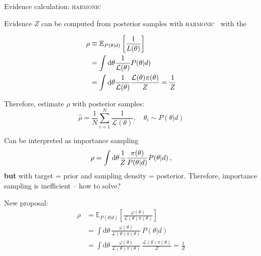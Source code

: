 \documentclass[usenames,dvipsnames,t]{beamer}
\begin{document}

\begin{frame}[allowframebreaks]{Evidence calculation: \textsc{harmonic}}

  Evidence $Z$ can be computed from posterior samples with \textsc{harmonic}~\cite{mcewen2023machinelearningassistedbayesian} with the 

  \begin{align*}
    \rho &\equiv \mathbb{E}_{P(\theta|d)}\left[\frac{1}{L(\theta)}\right] \\ 
    &= \int \mathop{}\!\mathrm{d} \theta \frac{1}{\mathcal{L}(\theta)} P(\theta | d) \\
    &= \int \mathop{}\!\mathrm{d} \theta \frac{1}{\mathcal{L}(\theta)} \frac{\mathcal{L}(\theta) \pi(\theta)}{Z} = \frac{1}{Z}
  \end{align*}

  Therefore, estimate $\rho$ with posterior samples:
  \begin{equation*}
    \hat{\rho} = \frac1N \sum_{i=1}^N \frac{1}{\mathcal{L}(\theta)}, \quad \theta_i \sim P(\theta|d)
  \end{equation*}

  Can be interpreted as importance sampling
  \begin{equation*}
    \rho = \int \mathop{}\!\mathrm{d} \theta \frac1Z \frac{\pi(\theta)}{P(\theta | d)} P(\theta | d) \, ,
  \end{equation*}
  \textbf{but} with target = prior and sampling density = posterior. Therefore, importance sampling is inefficient -- how to solve?

  New proposal:
  \begin{align*}
    \rho &= \mathbb{E}_{P(\theta| d)}\left[ \frac{\varphi(\theta)}{\mathcal{L}(\theta)\pi(\theta)} \right] \\
    &= \int \mathrm{d}\theta \, \frac{\varphi(\theta)}{\mathcal{L}(\theta)\pi(\theta)} \, P(\theta| d) \\
    &= \int \mathrm{d}\theta \, \frac{\varphi(\theta)}{\mathcal{L}(\theta)\pi(\theta)} \, \frac{\mathcal{L}(\theta)\pi(\theta)}{Z} = \frac{1}{Z}
  \end{align*}


\end{frame}
\end{document}
